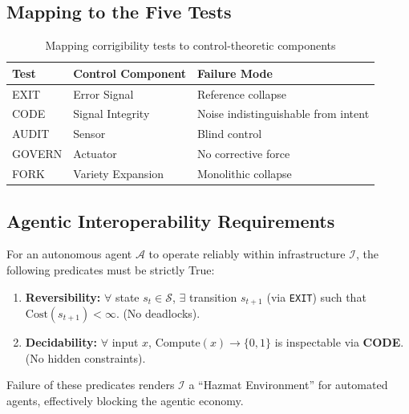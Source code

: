 \documentclass{article}
\begin{document}
\subsection{Mapping to the Five Tests}

\begin{table}[htbp]
\centering
\caption{Mapping corrigibility tests to control-theoretic components}
\label{tab:control-mapping}
\begin{tabular}{lll}
\hline
\textbf{Test} & \textbf{Control Component} & \textbf{Failure Mode} \\
\hline
EXIT & Error Signal & Reference collapse \\
CODE & Signal Integrity & Noise indistinguishable from intent \\
AUDIT & Sensor & Blind control \\
GOVERN & Actuator & No corrective force \\
FORK & Variety Expansion & Monolithic collapse \\
\hline
\end{tabular}
\end{table}

\subsection{Agentic Interoperability Requirements}

For an autonomous agent $\mathcal{A}$ to operate reliably within infrastructure $\mathcal{I}$, the following predicates must be strictly True:

\begin{enumerate}
    \item \textbf{Reversibility:} $\forall$ state $s_t \in \mathcal{S}$, $\exists$ transition $s_{t+1}$ (via \texttt{EXIT}) such that $\text{Cost}(s_{t+1}) < \infty$. (No deadlocks).
    \item \textbf{Decidability:} $\forall$ input $x$, $\text{Compute}(x) \to \{0,1\}$ is inspectable via \textbf{CODE}. (No hidden constraints).
\end{enumerate}

Failure of these predicates renders $\mathcal{I}$ a ``Hazmat Environment'' for automated agents, effectively blocking the agentic economy.
\end{document}
